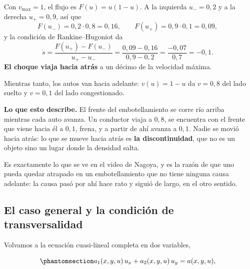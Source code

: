 \documentclass[
  spanish,
  a4paper,
]{scrbook}
\theoremstyle{definition}
\theoremstyle{plain}
\theoremstyle{definition}
\theoremstyle{plain}
\theoremstyle{definition}
\theoremstyle{remark}
\begin{document}
\begin{tcolorbox}[enhanced jigsaw, arc=.35mm, bottomrule=.15mm, bottomtitle=1mm, breakable, colback=white, colbacktitle=quarto-callout-tip-color!10!white, colframe=quarto-callout-tip-color-frame, coltitle=black, left=2mm, leftrule=.75mm, opacityback=0, opacitybacktitle=0.6, rightrule=.15mm, title=\textcolor{quarto-callout-tip-color}{\faLightbulb}\hspace{0.5em}{Solución}, titlerule=0mm, toprule=.15mm, toptitle=1mm]

Con \(v_{\max}=1\), el flujo es \(F(u) = u(1-u)\). A la izquierda
\(u_-=0{,}2\) y a la derecha \(u_+=0{,}9\), así que
\[F(u_-) = 0{,}2 \cdot 0{,}8 = 0{,}16, \qquad F(u_+) = 0{,}9\cdot 0{,}1 = 0{,}09,\]
y la condición de Rankine--Hugoniot da \[
\dot s = \frac{F(u_+)-F(u_-)}{u_+-u_-} = \frac{0{,}09 - 0{,}16}{0{,}9-0{,}2}
= \frac{-0{,}07}{0{,}7} = -0{,}1 .
\] \textbf{El choque viaja hacia atrás} a un décimo de la velocidad
máxima.

Mientras tanto, los autos van hacia adelante: \(v(u) = 1-u\) da
\(v = 0{,}8\) del lado suelto y \(v = 0{,}1\) del lado congestionado.

\textbf{Lo que esto describe.} El frente del embotellamiento se corre
río arriba mientras cada auto avanza. Un conductor viaja a \(0{,}8\), se
encuentra con el frente que viene hacia él a \(0{,}1\), frena, y a
partir de ahí avanza a \(0{,}1\). Nadie se movió hacia atrás: lo que se
mueve hacia atrás es \textbf{la discontinuidad}, que no es un objeto
sino un lugar donde la densidad salta.

Es exactamente lo que se ve en el video de Nagoya, y es la razón de que
uno pueda quedar atrapado en un embotellamiento que no tiene ninguna
causa adelante: la causa pasó por ahí hace rato y siguió de largo, en el
otro sentido.

\end{tcolorbox}

\subsection{El caso general y la condición de
transversalidad}\label{sec-transversalidad}

Volvamos a la ecuación cuasi-lineal completa en dos variables,

\begin{equation}\protect\phantomsection\label{eq-cuasilineal-general}{
a_1(x,y,u)\,u_x + a_2(x,y,u)\,u_y = a(x,y,u),
}\end{equation}
\end{document}
